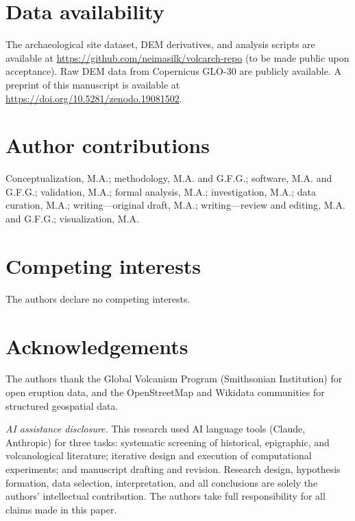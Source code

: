\documentclass[12pt,a4paper]{article}
\begin{document}
\section*{Data availability}

The archaeological site dataset, DEM derivatives, and analysis scripts are available at \url{https://github.com/neimasilk/volcarch-repo} (to be made public upon acceptance). Raw DEM data from Copernicus GLO-30 are publicly available. A preprint of this manuscript is available at \url{https://doi.org/10.5281/zenodo.19081502}.


\section*{Author contributions}

Conceptualization, M.A.; methodology, M.A. and G.F.G.; software, M.A. and G.F.G.; validation, M.A.; formal analysis, M.A.; investigation, M.A.; data curation, M.A.; writing---original draft, M.A.; writing---review and editing, M.A. and G.F.G.; visualization, M.A.

\section*{Competing interests}

The authors declare no competing interests.

\section*{Acknowledgements}

The authors thank the Global Volcanism Program (Smithsonian Institution) for open eruption data, and the OpenStreetMap and Wikidata communities for structured geospatial data.

\textit{AI assistance disclosure.} This research used AI language tools (Claude, Anthropic) for three tasks: systematic screening of historical, epigraphic, and volcanological literature; iterative design and execution of computational experiments; and manuscript drafting and revision. Research design, hypothesis formation, data selection, interpretation, and all conclusions are solely the authors' intellectual contribution. The authors take full responsibility for all claims made in this paper.




\end{document}
